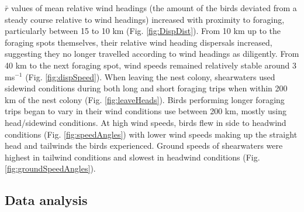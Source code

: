\documentclass[9pt,twocolumn,twoside,lineno]{pnas-new}
\begin{document}
    $\bar{r}$ values of mean relative wind headings (the amount of the birds deviated from a steady course relative to wind headings) increased with proximity to foraging, particularly between 15 to 10 km (Fig. \ref{fig:DispDist}). From 10 km up to the foraging spots themselves, their relative wind heading dispersals increased, suggesting they no longer travelled according to wind headings as diligently. From 40 km to the next foraging spot, wind speeds remained relatively stable around 3 ms$^{-1}$ (Fig. \ref{fig:dispSpeed}). When leaving the nest colony, shearwaters used sidewind conditions during both long and short foraging trips when within 200 km of the nest colony (Fig. \ref{fig:leaveHeads}). Birds performing longer foraging trips began to vary in their wind conditions use between 200 km, mostly using head/sidewind conditions. At high wind speeds, birds flew in side to headwind conditions (Fig. \ref{fig:speedAngles}) with lower wind speeds making up the straight head and tailwinds the birds experienced. Ground speeds of shearwaters were highest in tailwind conditions and slowest in headwind conditions (Fig. \ref{fig:groundSpeedAngles}).


\subsection*{Data analysis}
\end{document}
